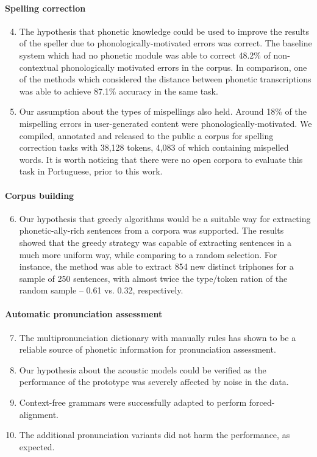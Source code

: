 \paragraph*{Spelling correction}
  \begin{enumerate}
    \setcounter{enumi}{3}
    \item The hypothesis that phonetic knowledge could be used to improve the results of the speller due to phonologically-motivated errors was correct. The baseline system which had no phonetic module was able to correct 48.2\% of non-contextual phonologically motivated errors in the corpus. In comparison, one of the methods which considered the distance between phonetic transcriptions was  able to achieve 87.1\% accuracy in the same task.
    \item Our assumption about the types of mispellings also held. Around 18\% of the mispelling errors in user-generated content were phonologically-motivated. We compiled, annotated and released to the public a corpus for spelling correction tasks with 38,128 tokens, 4,083 of which containing mispelled words. It is worth noticing that there were no open corpora to evaluate this task in Portuguese, prior to this work.
  \end{enumerate}

\paragraph*{Corpus building}
  \begin{enumerate}
    \setcounter{enumi}{5}
    \item Our hypothesis that greedy algorithms would be a suitable way for extracting phonetic-ally-rich sentences from a corpora was supported. The results showed that the greedy strategy was capable of extracting sentences in a much more uniform way, while comparing to a random selection. For instance, the method was able to extract 854 new distinct triphones for a sample of 250 sentences, with almost twice the type/token ration of the random sample -- 0.61 vs. 0.32, respectively.
  \end{enumerate}

\paragraph*{Automatic pronunciation assessment}
  \begin{enumerate}
    \setcounter{enumi}{6}
    \item The multipronunciation dictionary with manually rules has shown to be a reliable source of phonetic information for pronunciation assessment.
    \item Our hypothesis about the acoustic models could be verified as the performance of the prototype was severely affected by noise in the data.
    \item Context-free grammars were successfully adapted to perform forced-alignment.
    \item The additional pronunciation variants did not harm the performance, as expected.
  \end{enumerate}

